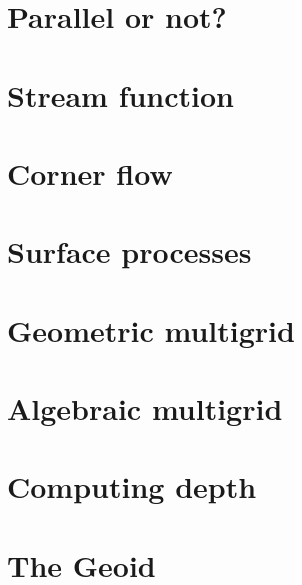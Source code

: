 \section{Parallel or not?} \label{sec:parallel}  %
\newpage %
\section{Stream function} \label{sec:streamfunction}  %
\newpage %
\section{Corner flow} \label{sec:cornerflow}  %
\newpage %
\section{Surface processes \label{sec:surfaceprocesses}}  %
\newpage %
\section{Geometric multigrid}  %
\newpage %
\section{Algebraic multigrid}  %
\newpage %
\section{Computing depth \label{ss:depth}}  %
\newpage %
\section{The Geoid} \label{ss:geoid}  %
\newpage %
